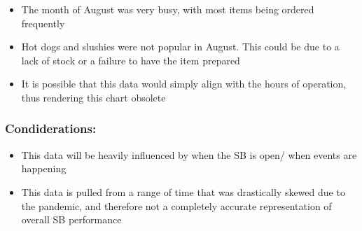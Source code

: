 \documentclass[
]{article}
\providecommand{\tightlist}{%
  \setlength{\itemsep}{0pt}\setlength{\parskip}{0pt}}
\begin{document}
\begin{itemize}
\tightlist
\item
  The month of August was very busy, with most items being ordered
  frequently
\item
  Hot dogs and slushies were not popular in August. This could be due to
  a lack of stock or a failure to have the item prepared
\item
  It is possible that this data would simply align with the hours of
  operation, thus rendering this chart obsolete
\end{itemize}

\hypertarget{condiderations}{%
\subsubsection{Condiderations:}\label{condiderations}}

\begin{itemize}
\tightlist
\item
  This data will be heavily influenced by when the SB is open/ when
  events are happening
\item
  This data is pulled from a range of time that was drastically skewed
  due to the pandemic, and therefore not a completely accurate
  representation of overall SB performance
\end{itemize}
\end{document}
